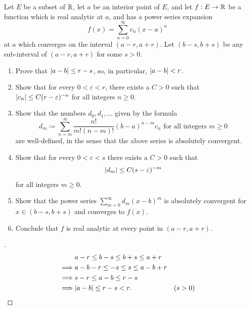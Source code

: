 \begin{ex}\label{ii:ex:4.2.8}
  Let \(E\) be a subset of \(\mathbb{R}\), let \(a\) be an interior point of \(E\), and let \(f : E \to \mathbb{R}\) be a function which is real analytic at \(a\), and has a power series expansion
  \[
    f(x) = \sum_{n = 0}^\infty c_n (x - a)^n
  \]
  at \(a\) which converges on the interval \((a - r, a + r)\).
  Let \((b - s, b + s)\) be any sub-interval of \((a - r, a + r)\) for some \(s > 0\).
  \begin{enumerate}
    \item\label{ii:ex:4.2.8.a} Prove that \(\left\lvert a - b\right\rvert \leq r - s\), so, in particular, \(\left\lvert a - b\right\rvert < r\).
    \item\label{ii:ex:4.2.8.b} Show that for every \(0 < \varepsilon < r\), there exists a \(C > 0\) such that \(\left\lvert c_n\right\rvert \leq C(r - \varepsilon)^{-n}\) for all integers \(n \geq 0\).
    \item\label{ii:ex:4.2.8.c} Show that the numbers \(d_0, d_1, \dots\) given by the formula
    \[
      d_m \coloneqq \sum_{n = m}^\infty \dfrac{n!}{m! (n - m)!} (b - a)^{n - m} c_n \text{ for all integers } m \geq 0
    \]
    are well-defined, in the sense that the above series is absolutely convergent.
    \item\label{ii:ex:4.2.8.d} Show that for every \(0 < \varepsilon < s\) there exists a \(C > 0\) such that
    \[
      \left\lvert d_m\right\rvert \leq C(s - \varepsilon)^{-m}
    \]
    for all integers \(m \geq 0\).
    \item\label{ii:ex:4.2.8.e} Show that the power series \(\sum_{m = 0}^\infty d_m (x - b)^m\) is absolutely convergent for \(x \in (b - s, b + s)\) and converges to \(f(x)\).
    \item\label{ii:ex:4.2.8.f} Conclude that \(f\) is real analytic at every point in \((a - r, a + r)\).
  \end{enumerate}
\end{ex}

\begin{proof}[]
  \begin{align*}
             & a - r \leq b - s \leq b + s \leq a + r            \\
    \implies & a - b - r \leq -s \leq s \leq a - b + r           \\
    \implies & s - r \leq a - b \leq r - s                       \\
    \implies & \abs{a - b} \leq r - s < r.             & (s > 0)
  \end{align*}
\end{proof}

